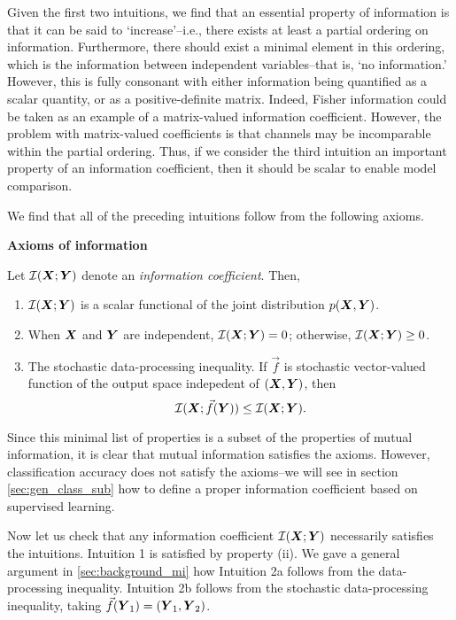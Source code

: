 \documentclass[12pt]{article}
\begin{document}
Given the first two intuitions, we find that an essential property of
information is that it can be said to `increase'--i.e., there exists
at least a partial ordering on information.  Furthermore, there should
exist a minimal element in this ordering, which is the information
between independent variables--that is, `no information.' However,
this is fully consonant with either information being quantified as a
scalar quantity, or as a positive-definite matrix.  Indeed, Fisher
information could be taken as an example of a matrix-valued
information coefficient.  However, the problem with matrix-valued
coefficients is that channels may be incomparable within the partial
ordering.  Thus, if we consider the third intuition an important
property of an information coefficient, then it should be scalar to
enable model comparison.

We find that all of the preceding intuitions follow from the following
axioms.

\noindent\textbf{Axioms of information}

Let $\mathcal{I}(\boldsymbol{X}; \boldsymbol{Y})$ denote an \emph{information coefficient}.
Then,
\begin{enumerate}
\item $\mathcal{I}(\boldsymbol{X}; \boldsymbol{Y})$ is a scalar functional of the joint distribution $p(\boldsymbol{X}, \boldsymbol{Y})$.
\item When $\boldsymbol{X}$ and $\boldsymbol{Y}$ are independent, $\mathcal{I}(\boldsymbol{X}; \boldsymbol{Y}) = 0$; otherwise, $\mathcal{I}(\boldsymbol{X}; \boldsymbol{Y}) \geq 0$.
\item 
The stochastic data-processing inequality.  If $\vec{f}$ is stochastic
vector-valued function of the output space indepedent of $(\boldsymbol{X}, \boldsymbol{Y})$,
then
\[
\mathcal{I}(\boldsymbol{X}; \vec{f}(\boldsymbol{Y})) \leq \mathcal{I}(\boldsymbol{X}; \boldsymbol{Y}).
\]
\end{enumerate}

Since this minimal list of properties is a subset of the properties of
mutual information, it is clear that mutual information satisfies the
axioms.  However, classification accuracy does not satisfy the
axioms--we will see in section \ref{sec:gen_class_sub} how to define
a proper information coefficient based on supervised learning.

Now let us check that any information coefficient
$\mathcal{I}(\boldsymbol{X}; \boldsymbol{Y})$ necessarily satisfies the intuitions.
Intuition 1 is satisfied by property (ii).  We gave a general argument
in \ref{sec:background_mi} how Intuition 2a follows from the
data-processing inequality.  Intuition 2b follows from the stochastic
data-processing inequality, taking $\vec{f}(\boldsymbol{Y}_1) = (\boldsymbol{Y}_1, \boldsymbol{Y}_2)$.
\end{document}
